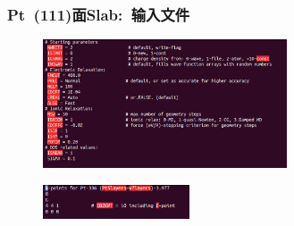 {
	\frametitle{\textrm{Pt~(111)}面\textrm{Slab}:~输入文件}
	{\fontsize{9.5pt}{5.2pt}}%
\begin{figure}[h!]
\centering
\vskip -5pt
\includegraphics[height=1.5in,viewport=0 10 690 388,clip]{Figures/Pt_Slab-INCAR.png}
\caption{\fontsize{6.2pt}{5.2pt}}%
\label{Pt_Slab-INCAR}
\end{figure}
\begin{figure}[h!]
\centering
\vskip -5pt
\includegraphics[height=0.4in,viewport=0 10 400 98,clip]{Figures/Pt_Slab-KPOINTS.png}
\caption{\fontsize{6.2pt}{5.2pt}}%
\label{Pt_Slab-KPOINTS}
\end{figure}
}
\frame
